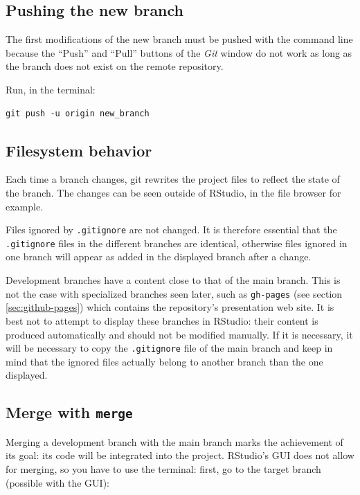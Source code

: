 \documentclass[
  12pt,
  american,
  a4paper,
  extrafontsizes,onecolumn,openright
  ]{memoir}
\begin{document}
\subsection{Pushing the new branch}\label{pushing-the-new-branch}

The first modifications of the new branch must be pushed with the command line because the \enquote{Push} and \enquote{Pull} buttons of the \emph{Git} window do not work as long as the branch does not exist on the remote repository.

Run, in the terminal:

\begin{verbatim}
git push -u origin new_branch
\end{verbatim}

\subsection{Filesystem behavior}\label{filesystem-behavior}

Each time a branch changes, git rewrites the project files to reflect the state of the branch.
The changes can be seen outside of RStudio, in the file browser for example.

Files ignored by \texttt{.gitignore} are not changed.
It is therefore essential that the \texttt{.gitignore} files in the different branches are identical, otherwise files ignored in one branch will appear as added in the displayed branch after a change.

Development branches have a content close to that of the main branch.
This is not the case with specialized branches seen later, such as \texttt{gh-pages} (see section \ref{sec:github-pages}) which contains the repository's presentation web site.
It is best not to attempt to display these branches in RStudio: their content is produced automatically and should not be modified manually.
If it is necessary, it will be necessary to copy the \texttt{.gitignore} file of the main branch and keep in mind that the ignored files actually belong to another branch than the one displayed.

\subsection{\texorpdfstring{Merge with \texttt{merge}}{Merge with merge}}\label{merge-with-merge}

Merging a development branch with the main branch marks the achievement of its goal: its code will be integrated into the project.
RStudio's GUI does not allow for merging, so you have to use the terminal: first, go to the target branch (possible with the GUI):
\end{document}
